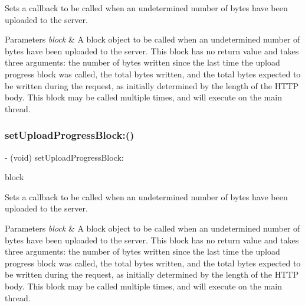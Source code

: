 Sets a callback to be called when an undetermined number of bytes have been uploaded to the server.


\begin{DoxyParams}{Parameters}
{\em block} & A block object to be called when an undetermined number of bytes have been uploaded to the server. This block has no return value and takes three arguments\+: the number of bytes written since the last time the upload progress block was called, the total bytes written, and the total bytes expected to be written during the request, as initially determined by the length of the H\+T\+TP body. This block may be called multiple times, and will execute on the main thread. \\
\hline
\end{DoxyParams}
\mbox{\label{interface_a_f_u_r_l_connection_operation_a96a234d5491685170008b96f6fd01afb}} 
\subsubsection{\texorpdfstring{set\+Upload\+Progress\+Block\+:()}{setUploadProgressBlock:()}\hspace{0.1cm}{\footnotesize\ttfamily [2/3]}}
{\footnotesize\ttfamily -\/ (void) set\+Upload\+Progress\+Block\+: \begin{DoxyParamCaption}\item[{(nullable void($^\wedge$)(N\+S\+U\+Integer bytes\+Written, long long total\+Bytes\+Written, long long total\+Bytes\+Expected\+To\+Write))}]{block }\end{DoxyParamCaption}}

Sets a callback to be called when an undetermined number of bytes have been uploaded to the server.


\begin{DoxyParams}{Parameters}
{\em block} & A block object to be called when an undetermined number of bytes have been uploaded to the server. This block has no return value and takes three arguments\+: the number of bytes written since the last time the upload progress block was called, the total bytes written, and the total bytes expected to be written during the request, as initially determined by the length of the H\+T\+TP body. This block may be called multiple times, and will execute on the main thread. \\
\hline
\end{DoxyParams}
\mbox{\label{interface_a_f_u_r_l_connection_operation_a96a234d5491685170008b96f6fd01afb}} 
